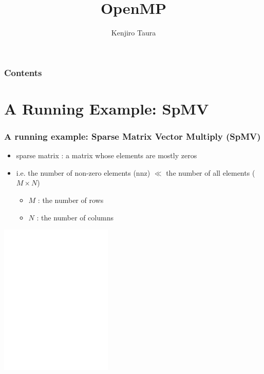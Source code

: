 \documentclass[12pt,dvipdfmx]{beamer}
\title{OpenMP}
\institute{}
\author{Kenjiro Taura}
\date{}
\begin{document}
\maketitle

\begin{frame}
\frametitle{Contents}
\tableofcontents
\end{frame}

\section{A Running Example: SpMV}
\begin{frame}
  \frametitle{A running example: Sparse Matrix Vector Multiply (SpMV)}
  \begin{itemize}
  \item sparse matrix : a matrix whose elements are mostly zeros
  \item i.e. the number of non-zero elements (nnz) $\ll$ the number of all elements ($M \times N$)
    \begin{itemize}
    \item $M$ : the number of rows
    \item $N$ : the number of columns
    \end{itemize}
  \end{itemize}

  \begin{center}
  \includegraphics[width=0.4\textwidth]{out/pdf/svg/spmv.pdf}
  \end{center}
\end{frame}
\end{document}

